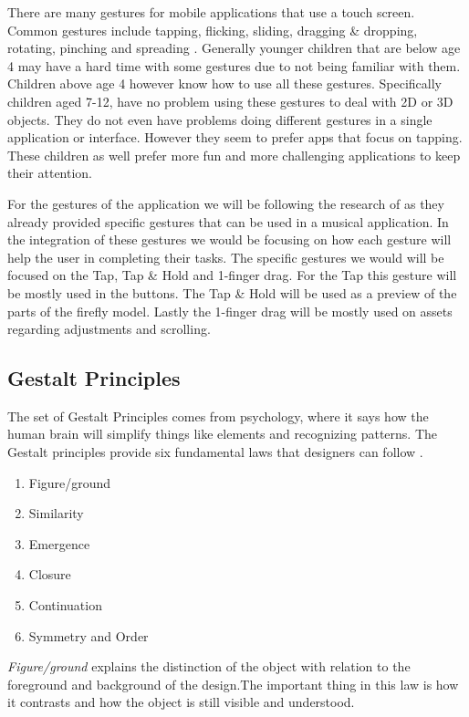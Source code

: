 There are many gestures for mobile applications that use a touch screen. Common gestures include tapping, flicking, sliding, dragging \& dropping, rotating, pinching and spreading \cite{aziz2013children}. Generally younger children that are below age 4 may have a hard time with some gestures due to not being familiar with them. Children above age 4 however know how to use all these gestures. Specifically children aged 7-12, have no problem using these gestures to deal with 2D or 3D objects. They do not even have problems doing different gestures in a single application or interface. However they seem to prefer apps that focus on tapping. These children as well prefer more fun and more challenging applications to keep their attention.

For the gestures of the application we will be following the research of  as they already provided specific gestures that can be used in a musical application. In the integration of these gestures we would be focusing on how each gesture will help the user in completing their tasks. The specific gestures we would will be focused on the Tap, Tap \& Hold and 1-finger drag. For the Tap this gesture will be mostly used in the buttons. The Tap & Hold will be used as a preview of the parts of the firefly model. Lastly the 1-finger drag will be mostly used on assets regarding adjustments and scrolling.

\subsection{Gestalt Principles}
The set of Gestalt Principles comes from psychology, where it says how the human brain will simplify things like elements and recognizing patterns. The Gestalt principles provide six fundamental laws that designers can follow \cite{yee2002user,chapman_2018}.

\begin{enumerate} 
\item Figure/ground
\item Similarity
\item Emergence
\item Closure
\item Continuation
\item Symmetry and Order
\end{enumerate}

\textit{Figure/ground} explains the distinction of the object with relation to the foreground and background of the design.The important thing in this law is how it contrasts and how the object is still visible and understood.

